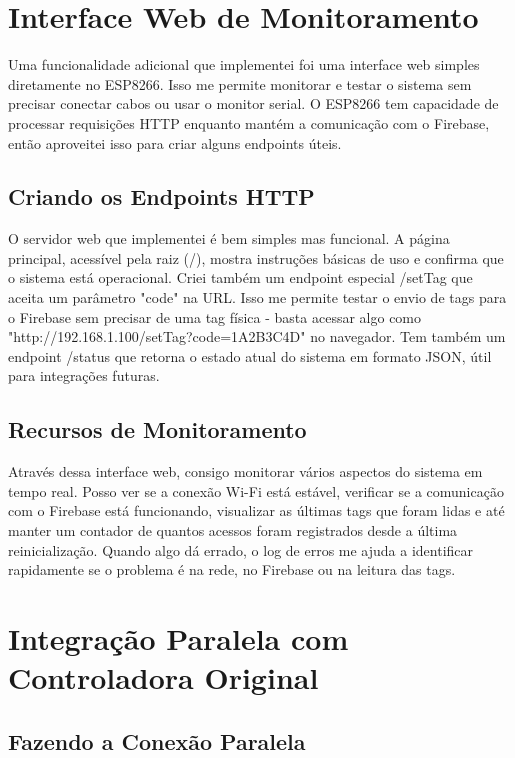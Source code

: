 \section{Interface Web de Monitoramento}
\label{sec:interface-web}

Uma funcionalidade adicional que implementei foi uma interface web simples diretamente no ESP8266. Isso me permite monitorar e testar o sistema sem precisar conectar cabos ou usar o monitor serial. O ESP8266 tem capacidade de processar requisições HTTP enquanto mantém a comunicação com o Firebase, então aproveitei isso para criar alguns endpoints úteis.

\subsection{Criando os Endpoints HTTP}

O servidor web que implementei é bem simples mas funcional. A página principal, acessível pela raiz (/), mostra instruções básicas de uso e confirma que o sistema está operacional. Criei também um endpoint especial /setTag que aceita um parâmetro "code" na URL. Isso me permite testar o envio de tags para o Firebase sem precisar de uma tag física - basta acessar algo como "http://192.168.1.100/setTag?code=1A2B3C4D" no navegador. Tem também um endpoint /status que retorna o estado atual do sistema em formato JSON, útil para integrações futuras.

\subsection{Recursos de Monitoramento}

Através dessa interface web, consigo monitorar vários aspectos do sistema em tempo real. Posso ver se a conexão Wi-Fi está estável, verificar se a comunicação com o Firebase está funcionando, visualizar as últimas tags que foram lidas e até manter um contador de quantos acessos foram registrados desde a última reinicialização. Quando algo dá errado, o log de erros me ajuda a identificar rapidamente se o problema é na rede, no Firebase ou na leitura das tags.

\section{Integração Paralela com Controladora Original}
\label{sec:integracao-paralela}

\subsection{Fazendo a Conexão Paralela}

